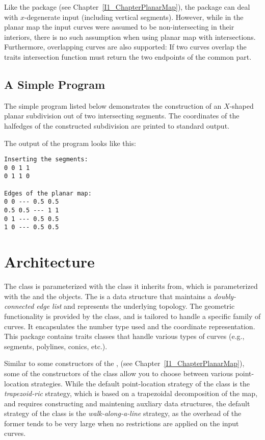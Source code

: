 Like the  package (see Chapter~\ref{I1_ChapterPlanarMap}), 
the  package can deal with $x$-degenerate 
input (including vertical segments). However, while in the planar map the input
curves were assumed to be non-intersecting in their interiors, there is no 
such assumption when using planar map with intersections. Furthermore, 
overlapping curves are also supported: If two curves overlap the traits 
intersection function must return the two endpoints of the common part.

\subsection{A Simple Program}
\label{ssec:example1}
The simple program listed below demonstrates the construction of an
$X$-shaped planar subdivision out of two intersecting segments.
The coordinates of the halfedges of the constructed subdivision are
printed to standard output.


The output of the program looks like this:
\begin{verbatim}
Inserting the segments:
0 0 1 1
0 1 1 0

Edges of the planar map:
0 0 --- 0.5 0.5
0.5 0.5 --- 1 1
0 1 --- 0.5 0.5
1 0 --- 0.5 0.5
\end{verbatim}

\section{Architecture}

The  class 
is parameterized with the  class it inherits from, which 
is parameterized with the  and the  objects. The
 is a data structure that maintains a
{\em doubly-connected edge list} and represents the underlying topology.
The geometric functionality is provided by the  class, and is
tailored to handle a specific family of curves. It encapsulates the
number type used and the coordinate representation. This package
contains traits classes that handle various types of curves (e.g.,
segments, polylines, conics, etc.).

Similar to some constructors of the , 
(see Chapter~\ref{I1_ChapterPlanarMap}), some of the constructors of the
 class allow you to choose between
various point-location strategies. While the default point-location
strategy of the  class is the {\it trapezoid-ric} strategy,
which is based on a trapezoidal decomposition of the map, and requires
constructing and maintening auxliary data structures, the default strategy
of the  class is the
{\it walk-along-a-line\/} strategy, as the overhead of the former
tends to be very large when no restrictions are applied on the input curves.

